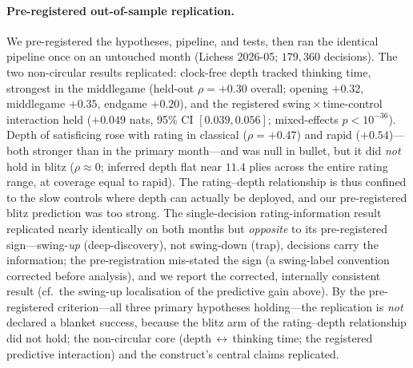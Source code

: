 \documentclass[11pt]{article}
\begin{document}
\paragraph{Pre-registered out-of-sample replication.} We pre-registered \citep{nosek2018} the
hypotheses, pipeline, and tests, then ran the identical pipeline once on an untouched month
(Lichess 2026-05;
$179{,}360$ decisions). The two non-circular results replicated: clock-free depth tracked thinking
time, strongest in the middlegame (held-out $\rho=+0.30$ overall; opening $+0.32$, middlegame
$+0.35$, endgame $+0.20$), and the registered swing\,$\times$\,time-control interaction held
($+0.049$ nats, 95\% CI $[0.039,0.056]$; mixed-effects $p<10^{-36}$). Depth of satisficing rose
with rating in classical ($\rho=+0.47$) and rapid ($+0.54$)---both stronger than in the primary
month---and was null in bullet, but it did \emph{not} hold in blitz ($\rho\approx0$; inferred
depth flat near $11.4$ plies across the entire rating range, at coverage equal to rapid). The
rating--depth relationship is thus confined to the slow controls where depth can actually be
deployed, and our pre-registered blitz prediction was too strong. The single-decision
rating-information result replicated nearly identically on both months but \emph{opposite} to its
pre-registered sign---swing-\emph{up} (deep-discovery), not swing-down (trap), decisions carry the
information; the pre-registration mis-stated the sign (a swing-label convention corrected before
analysis), and we report the corrected, internally consistent result (cf.\ the swing-up
localisation of the predictive gain above). By the pre-registered criterion---all three primary
hypotheses holding---the replication is \emph{not} declared a blanket success, because the blitz
arm of the rating--depth relationship did not hold; the non-circular core (depth\,$\leftrightarrow$\,thinking
time; the registered predictive interaction) and the construct's central claims replicated.
\end{document}

